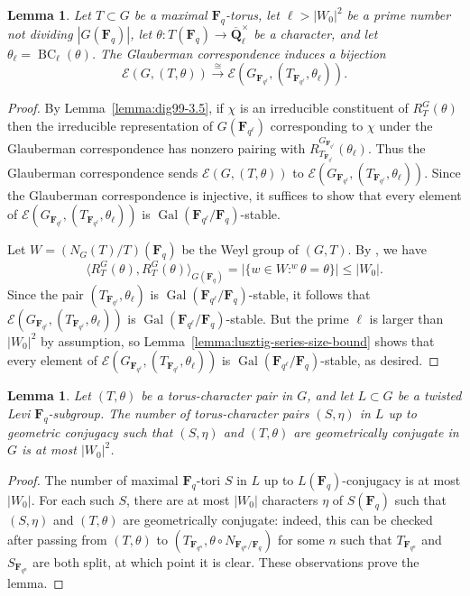 \documentclass[11pt,reqno]{amsart}
\newtheorem{lemma}[theorem]{Lemma}
\theoremstyle{definition}
\newcommand{\F}{{\mathbf F}}
\newcommand{\Q}{{\mathbf Q}}
\newcommand{\cE}{\mathcal{E}}
\DeclareMathOperator{\BC}{BC}
\DeclareMathOperator{\Gal}{Gal}
\newcommand{\ol}[1]{\overline{#1}}
\newcommand{\co}[1]{\colon}
\begin{document}
\begin{lemma}\label{lemma:glauberman-lusztig-series-bijection}
    Let $T \subset G$ be a maximal $\F_q$-torus, let $\ell > |W_0|^2$ be a prime number not dividing $|G(\F_q)|$, let $\theta\colon T(\F_q) \to \ol\Q_\ell^\times$ be a character, and let $\theta_\ell = \BC_\ell(\theta)$. The Glauberman correspondence induces a bijection
    \[
    \cE(G, (T,\theta)) \xrightarrow[]{\cong} \cE(G_{\F_{q^\ell}}, (T_{\F_{q^\ell}},\theta_\ell)).
    \]
\end{lemma}

\begin{proof}
    By Lemma~\ref{lemma:dig99-3.5}, if $\chi$ is an irreducible constituent of $R_T^G(\theta)$ then the irreducible representation of $G(\F_{q^\ell})$ corresponding to $\chi$ under the Glauberman correspondence has nonzero pairing with $R_{T_{\F_{q^\ell}}}^{G_{\F_{q^\ell}}}(\theta_\ell)$. Thus the Glauberman correspondence sends $\cE(G, (T,\theta))$ to $\cE(G_{\F_{q^\ell}}, (T_{\F_{q^\ell}},\theta_\ell))$. Since the Glauberman correspondence is injective, it suffices to show that every element of $\cE(G_{\F_{q^\ell}}, (T_{\F_{q^\ell}}, \theta_\ell))$ is $\Gal(\F_{q^\ell}/\F_q)$-stable.
    
    Let $W = (N_{G}(T)/T)(\F_q)$ be the Weyl group of $(G, T)$. By \cite[Theorem 6.8]{DL76}, we have
    \[
    \langle R_{T}^{G}(\theta), R_{T}^{G}(\theta)\rangle_{G(\F_q)} = |\{w \in W\co {}^w\theta = \theta\}| \leq |W_0|.
    \]
    Since the pair $(T_{\F_{q^\ell}}, \theta_\ell)$ is $\Gal(\F_{q^\ell}/\F_q)$-stable, it follows that $\cE(G_{\F_{q^\ell}}, (T_{\F_{q^\ell}}, \theta_\ell))$ is $\Gal(\F_{q^\ell}/\F_q)$-stable. But the prime $\ell$ is larger than $|W_0|^2$ by assumption, so Lemma~\ref{lemma:lusztig-series-size-bound} shows that every element of $\cE(G_{\F_{q^\ell}}, (T_{\F_{q^\ell}}, \theta_\ell))$ is $\Gal(\F_{q^\ell}/\F_q)$-stable, as desired.
\end{proof}

\begin{lemma}\label{lemma:size-bound-for-torus-character-pairs}
    Let $(T, \theta)$ be a torus-character pair in $G$, and let $L \subset G$ be a twisted Levi $\F_q$-subgroup. The number of torus-character pairs $(S,\eta)$ in $L$ up to geometric conjugacy such that $(S, \eta)$ and $(T, \theta)$ are geometrically conjugate in $G$ is at most $|W_0|^2$.
\end{lemma}

\begin{proof}
    The number of maximal $\F_q$-tori $S$ in $L$ up to $L(\F_q)$-conjugacy is at most $|W_0|$. For each such $S$, there are at most $|W_0|$ characters $\eta$ of $S(\F_q)$ such that $(S, \eta)$ and $(T, \theta)$ are geometrically conjugate: indeed, this can be checked after passing from $(T, \theta)$ to $(T_{\F_{q^n}}, \theta \circ N_{\F_{q^n}/\F_q})$ for some $n$ such that $T_{\F_{q^n}}$ and $S_{\F_{q^n}}$ are both split, at which point it is clear. These observations prove the lemma.
\end{proof}
\end{document}
